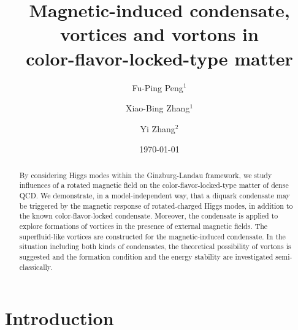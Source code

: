 \documentclass[prd, showpacs,nofootinbib,amsmath,amssymb]{revtex4}
\begin{document}
\title{Magnetic-induced condensate, vortices and vortons in\\
	 color-flavor-locked-type matter}
\author{Fu-Ping Peng$^1$}
\author{Xiao-Bing Zhang$^1$}
\author{Yi Zhang$^2$}

\date{\today}

\begin{abstract}
By considering Higgs modes within the Ginzburg-Landau framework, we study influences of a rotated magnetic field on
the color-flavor-locked-type matter of dense QCD. We demonstrate, in a model-independent way, that a diquark condensate
may be triggered by the magnetic response of rotated-charged Higgs modes, in addition to the known color-flavor-locked 
condensate.
Moreover, the condensate is applied to explore formations of vortices in the presence of external magnetic fields. The superfluid-like vortices are constructed for the magnetic-induced condensate. In the situation including both kinds of condensates, the theoretical possibility of vortons is suggested and the formation condition and the energy stability are investigated semi-classically.

\end{abstract}

\maketitle

\section{Introduction}
\end{document}
